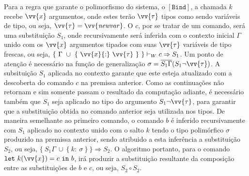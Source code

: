 Para a regra que garante o polimorfismo do sistema, o $[\mathtt{Bind}]$, a chamada $k$ recebe $\vv{x}$ argumentos, onde estes terão $\vv{\tau}$ tipos como sendo variáveis de tipo, ou seja, $\vv{\tau} = \vv{\mathit{newvar}}$.
O $c$, por se tratar de um comando, será uma substituição $S_1$, onde recursivamente será inferida com o contexto inicial $\Gamma$ unido com os $\vv{x}$ argumentos tipados com suas $\vv{\tau}$ variáveis de tipo frescas, ou seja, $\{\ \Gamma\ \cup\ \{\ \vv{x}{:}\ \vv{\tau}\ \}\ \} \vdash_W c \Rightarrow S_1$.
Um ponto de atenção é necessário na função de generalização $\sigma = \overline{S_1\Gamma}(S_1 \neg\vv{\tau})$.
A subsituição $S_1$ aplicada no contexto garante que este esteja atualizado com a descoberta do comando $c$ na premissa anterior.
Como as continuações não retornam e sim somente passam o resultado da computação adiante, é necessário também que $S_1$ seja aplicado no tipo do argumento $S_1 \neg\vv{\tau}$, para garantir que a substituição obtida no comando anterior seja utilizada nos tipos.
De maneira semelhante ao primeiro comando, o comando $b$ é inferido recursivamente com $S_1$ aplicado no contexto unido com o salto $k$ tendo o tipo polimórfico $\sigma$ produzido na premissa anterior, sendo atribuido a esta inferência a substituição $S_2$, ou seja, $\{\ S_1\Gamma\ \cup\ \{\ k{:}\ \sigma \ \} \ \} \Rightarrow S_2$.
O algoritmo portanto, para o comando $\mathtt{let}\ k(\vv{x}) = c\ \mathtt{in}\ b$, irá produzir a substituição resultante da composição entre as substituições de $b$ e $c$, ou seja, $S_2 \circ S_2$.
